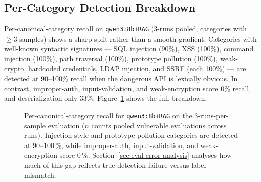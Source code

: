 \subsection{Per-Category Detection Breakdown}

Per-canonical-category recall on \texttt{qwen3:8b+RAG} (3-runs pooled, categories with $\geq 3$ samples) shows a sharp split rather than a smooth gradient. Categories with well-known syntactic signatures --- SQL injection (90\%), XSS (100\%), command injection (100\%), path traversal (100\%), prototype pollution (100\%), weak-crypto, hardcoded credentials, LDAP injection, and SSRF (each 100\%) --- are detected at 90--100\% recall when the dangerous API is lexically obvious. In contrast, improper-auth, input-validation, and weak-encryption score 0\% recall, and deserialization only 33\%. Figure~\ref{fig:r1-category} shows the full breakdown.

\begin{figure}[H]
\centering
{}
\caption[Per-canonical-category recall for the headline configuration.]{Per-canonical-category recall for \texttt{qwen3:8b+RAG} on the 3-runs-per-sample evaluation ($n$ counts pooled vulnerable evaluations across runs). Injection-style and prototype-pollution categories are detected at 90--100\,\%, while improper-auth, input-validation, and weak-encryption score 0\,\%. Section~\ref{sec:eval-error-analysis} analyses how much of this gap reflects true detection failure versus label mismatch.}
\label{fig:r1-category}
\end{figure}

